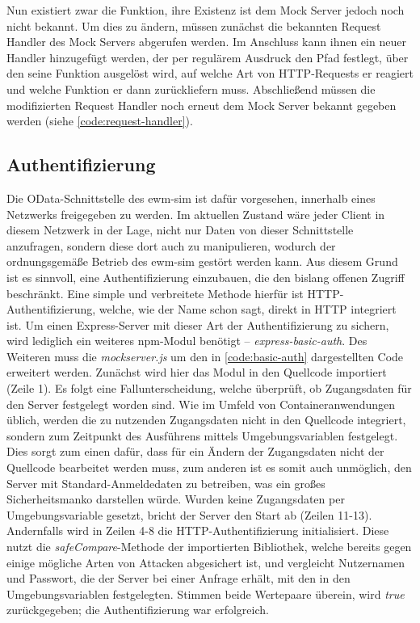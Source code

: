 

Nun existiert zwar die Funktion, ihre Existenz ist dem Mock Server jedoch noch nicht bekannt.
Um dies zu ändern, müssen zunächst die bekannten Request Handler des Mock Servers abgerufen werden.
Im Anschluss kann ihnen ein neuer Handler hinzugefügt werden, der per regulärem Ausdruck den Pfad festlegt, über den seine Funktion ausgelöst wird, auf welche Art von \ac{HTTP}-Requests er reagiert und welche Funktion er dann zurückliefern muss.
Abschließend müssen die modifizierten Request Handler noch erneut dem Mock Server bekannt gegeben werden (siehe \autoref{code:request-handler}).




\subsection{Authentifizierung}
Die OData-Schnittstelle des \ac{ewm-sim} ist dafür vorgesehen, innerhalb eines Netzwerks freigegeben zu werden.
Im aktuellen Zustand wäre jeder Client in diesem Netzwerk in der Lage, nicht nur Daten von dieser Schnittstelle anzufragen, sondern diese dort auch zu manipulieren, wodurch der ordnungsgemäße Betrieb des \ac{ewm-sim} gestört werden kann.
Aus diesem Grund ist es sinnvoll, eine Authentifizierung einzubauen, die den bislang offenen Zugriff beschränkt.
Eine simple und verbreitete Methode hierfür ist \ac{HTTP}-Authentifizierung, welche, wie der Name schon sagt, direkt in \ac{HTTP} integriert ist.
Um einen Express-Server mit dieser Art der Authentifizierung zu sichern, wird lediglich ein weiteres \ac{npm}-Modul benötigt -- \emph{express-basic-auth}.
Des Weiteren muss die \emph{mockserver.js} um den in \autoref{code:basic-auth} dargestellten Code erweitert werden.
Zunächst wird hier das Modul in den Quellcode importiert (Zeile 1).
Es folgt eine Fallunterscheidung, welche überprüft, ob Zugangsdaten für den Server festgelegt worden sind.
Wie im Umfeld von Containeranwendungen üblich, werden die zu nutzenden Zugangsdaten nicht in den Quellcode integriert, sondern zum Zeitpunkt des Ausführens mittels Umgebungsvariablen festgelegt.
Dies sorgt zum einen dafür, dass für ein Ändern der Zugangsdaten nicht der Quellcode bearbeitet werden muss, zum anderen ist es somit auch unmöglich, den Server mit Standard-Anmeldedaten zu betreiben, was ein großes Sicherheitsmanko darstellen würde.
Wurden keine Zugangsdaten per Umgebungsvariable gesetzt, bricht der Server den Start ab (Zeilen 11-13).
Andernfalls wird in Zeilen 4-8 die \ac{HTTP}-Authentifizierung initialisiert.
Diese nutzt die \emph{safeCompare}-Methode der importierten Bibliothek, welche bereits gegen einige mögliche Arten von Attacken abgesichert ist, und vergleicht Nutzernamen und Passwort, die der Server bei einer Anfrage erhält, mit den in den Umgebungsvariablen festgelegten.
Stimmen beide Wertepaare überein, wird \emph{true} zurückgegeben; die Authentifizierung war erfolgreich.

